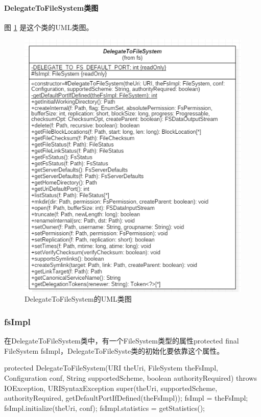 \paragraph{DelegateToFileSystem类图}
图 \ref{fig:DelegateToFileSystem} 是这个类的UML类图。
\begin{figure}
\centering
\includegraphics[width=1\linewidth]{UML/abstractfilesystem/DelegateToFileSystem.PNG}
\caption{DelegateToFileSystem的UML类图}
\label{fig:DelegateToFileSystem}
\end{figure}

\subsubsection{fsImpl}
在DelegateToFileSystem类中，有一个FileSystem类型的属性protected final FileSystem fsImpl，DelegateToFileSyste类的初始化要依靠这个属性。
\begin{java}
protected DelegateToFileSystem(URI theUri, FileSystem theFsImpl,
      Configuration conf, String supportedScheme, boolean authorityRequired)
      throws IOException, URISyntaxException {
    super(theUri, supportedScheme, authorityRequired,
        getDefaultPortIfDefined(theFsImpl));
    fsImpl = theFsImpl;
    fsImpl.initialize(theUri, conf);
    fsImpl.statistics = getStatistics();
  }
\end{java}

